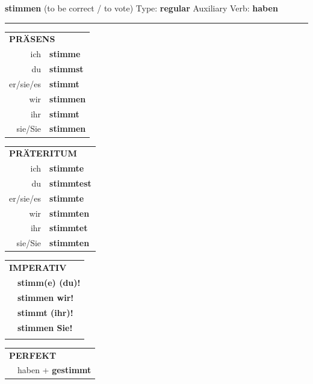 \documentclass[10pt,a4paper]{revtex4-2}
\begin{document}
\begin{verbbox-dat}
    {\Large \bf stimmen} (to be correct / to vote) \hfill Type: \textbf{regular} \hfill Auxiliary Verb: \textbf{haben} 
    
     \vspace{5pt}

    \hrule
    
    \vspace{5pt}

  \begin{tabular}{rl}
     \multicolumn{2}{l}{\textbf{PRÄSENS} }\\
    ich & \textbf{stimme}\\
    du & \textbf{stimmst}\\
    er/sie/es & \textbf{stimmt}\\
    wir & \textbf{stimmen}\\
    ihr & \textbf{stimmt}\\
    sie/Sie & \textbf{stimmen}\\
  \end{tabular}
  \hfill
     \begin{tabular}{rl}
    \multicolumn{2}{l}{\textbf{PRÄTERITUM} }\\
    ich & \textbf{stimmte}\\
    du & \textbf{stimmtest}\\
    er/sie/es & \textbf{stimmte}\\
    wir & \textbf{stimmten}\\
    ihr & \textbf{stimmtet}\\
    sie/Sie & \textbf{stimmten}\\
  \end{tabular}
  \hfill
  \begin{tabular}{rl}
     \multicolumn{2}{l}{\textbf{IMPERATIV} }\\
   & \textbf{stimm(e) (du)!}\\
   & \textbf{stimmen wir!}\\
   & \textbf{stimmt (ihr)!}\\
   & \textbf{stimmen Sie!}\\
   & \vspace{10pt}
  \end{tabular}

    \vspace{10pt}

 \begin{tabular}{rl}
     \multicolumn{2}{l}{\textbf{PERFEKT}}\\
   & haben + \textbf{gestimmt}\\
  \end{tabular}
\hfill
   \begin{tabular}{rl}
   

\end{tabular}
\end{verbbox-dat}
\end{document}
